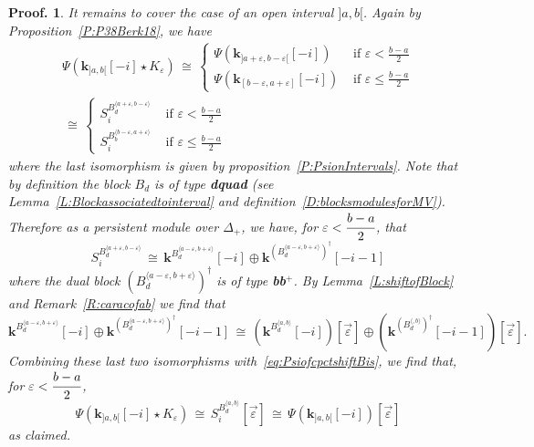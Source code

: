 \documentclass[a4paper, english, 11pt]{article}
\newcommand{\kk}[0]{\textbf{k}}
\newcommand{\0}{\vec{0}}
\newtheorem*{pf}{Proof.} }
\begin{document}
\begin{pf}
\smallskip

It remains to cover the case of an open interval $]a,b[$. Again by  Proposition~\ref{P:P38Berk18}, we have 
\begin{multline}\label{eq:PsiofcpctshiftBis}
 \Psi(\kk_{]a,b[}[-i] \star K_{\varepsilon}) \,\cong \,  \left\{ \begin{array}{ll}\Psi(\kk_{]a+\varepsilon,b-\varepsilon[}[-i]) & \mbox{ if }\varepsilon <\frac{b-a}{2} \\
      \Psi(\kk_{[b-\varepsilon,a+\varepsilon]}[-i]) & \mbox{ if }\varepsilon \leqslant\frac{b-a}{2} \end{array} \right .
      \\ \, \cong \, \left\{ \begin{array}{ll}S_i^{B_d^{\langle a+\varepsilon,b-\varepsilon\rangle}} & \mbox{ if }\varepsilon <\frac{b-a}{2} \\
      S_i^{B_b^{\langle b-\varepsilon,a+\varepsilon\rangle}} & \mbox{ if }\varepsilon \leqslant\frac{b-a}{2}                                                          \end{array}\right .
\end{multline} where the last isomorphism is given by proposition~\ref{P:PsionIntervals}.
Note that by definition the block $B_d$ is of type \textbf{dquad} (see Lemma~\ref{L:Blockassociatedtointerval} and definition~\ref{D:blocksmodulesforMV}). Therefore as a persistent module over $\Delta_+$, we have, for $\varepsilon < \cfrac{b-a}{2}$, that
$$S_i^{B_{d}^{\langle a+\varepsilon, b -\varepsilon\rangle}} \,\cong\, \kk^{B_{d}^{\langle a-\varepsilon, b+\varepsilon \rangle}} [-i] \oplus \kk^{(B_{d}^{\langle a-\varepsilon, b+\varepsilon \rangle})^\dagger} [-i-1]$$ where the dual block $(B_{d}^{\langle a-\varepsilon, b+\varepsilon \rangle})^\dagger$ is of type \textbf{bb}$^{+}$.  
By Lemma~\ref{L:shiftofBlock} and Remark~\ref{R:caracofab} we find that 
$$\kk^{B_{d}^{\langle a-\varepsilon, b+\varepsilon \rangle}} [-i] \oplus \kk^{(B_{d}^{\langle a-\varepsilon, b+\varepsilon \rangle})^\dagger} [-i-1] \, \cong \,(\kk^{B_{d}^{\langle a, b \rangle}} [-i])[\vec{\varepsilon}] \oplus (\kk^{(B_{d}^{\langle , b\rangle})^\dagger} [-i-1])[\vec{\varepsilon}]. $$
Combining these last two isomorphisms with~\eqref{eq:PsiofcpctshiftBis}, we find that,  for $\varepsilon < \cfrac{b-a}{2}$,
\begin{equation} \Psi(\kk_{]a,b[}[-i] \star K_{\varepsilon}) \,\cong \, S_i^{B_d^{\langle a, b\rangle}} [\vec{\varepsilon}]\, \cong \, \Psi(\kk_{]a,b[}[-i]) [\vec{\varepsilon}]
\end{equation}
as claimed.


\end{pf}
\end{document}
